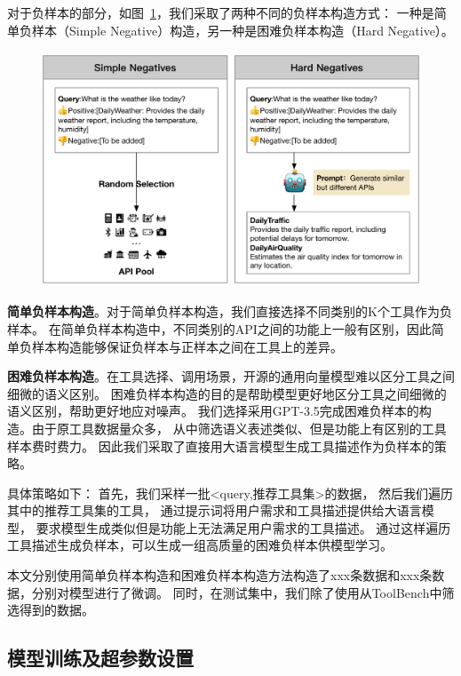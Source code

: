 对于负样本的部分，如图~\ref{fig:negative-sample-generation}，我们采取了两种不同的负样本构造方式：
一种是简单负样本（Simple Negative）构造，另一种是困难负样本构造（Hard Negative）。

\begin{figure}[!htp]
  \vspace{1em}
  \centering
  \setlength{\abovecaptionskip}{10pt} %
  \includegraphics[height=7cm]{../assets/ch3-负样本构造.pdf}
  \label{fig:negative-sample-generation}
\end{figure}

\indent \textbf{简单负样本构造}。对于简单负样本构造，我们直接选择不同类别的K个工具作为负样本。
在简单负样本构造中，不同类别的API之间的功能上一般有区别，因此简单负样本构造能够保证负样本与正样本之间在工具上的差异。

\indent \textbf{困难负样本构造}。在工具选择、调用场景，开源的通用向量模型难以区分工具之间细微的语义区别。
困难负样本构造的目的是帮助模型更好地区分工具之间细微的语义区别，帮助更好地应对噪声。
我们选择采用GPT-3.5完成困难负样本的构造。由于原工具数据量众多，
从中筛选语义表述类似、但是功能上有区别的工具样本费时费力。
因此我们采取了直接用大语言模型生成工具描述作为负样本的策略。

具体策略如下：
首先，我们采样一批<query,推荐工具集>的数据，
然后我们遍历其中的推荐工具集的工具，
通过提示词将用户需求和工具描述提供给大语言模型，
要求模型生成类似但是功能上无法满足用户需求的工具描述。
通过这样遍历工具描述生成负样本，可以生成一组高质量的困难负样本供模型学习。

\medskip

本文分别使用简单负样本构造和困难负样本构造方法构造了xxx条数据和xxx条数据，分别对模型进行了微调。
同时，在测试集中，我们除了使用从ToolBench中筛选得到的数据。

\subsection{模型训练及超参数设置}

